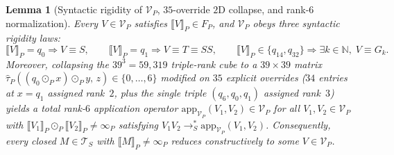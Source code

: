 \documentclass[11pt,reqno]{amsart}
\numberwithin{equation}{section}
\theoremstyle{plain}
\newtheorem{lemma}[theorem]{Lemma}
\theoremstyle{definition}
\theoremstyle{remark}
\newcommand{\TS}{\mathcal{T}_S}
\newcommand{\sem}[1]{\llbracket #1 \rrbracket}
\newcommand{\redSs}{\to_S^*}
\begin{document}
\begin{lemma}[Syntactic rigidity of $\mathcal{V}_P$, $35$-override $2$D collapse, and rank-$6$ normalization]\label{lem:pval-normalization}
Every $V \in \mathcal{V}_P$ satisfies $\sem{V}_P \in F_P$, and $\mathcal{V}_P$ obeys three syntactic rigidity laws:
\begin{equation}\label{eq:pval-rigidity}
\sem{V}_P = q_0 \Longrightarrow V \equiv S,
\qquad
\sem{V}_P = q_1 \Longrightarrow V \equiv T \equiv S S,
\qquad
\sem{V}_P \in \{q_{14}, q_{32}\} \Longrightarrow \exists k \in \mathbb{N},\; V \equiv G_k.
\end{equation}
Moreover, collapsing the $39^3 = 59{,}319$ triple-rank cube to a $39 \times 39$ matrix $\hat{\tau}_P((q_0 \odot_P x) \odot_P y,\, z) \in \{0, \dots, 6\}$ modified on $35$ explicit overrides ($34$ entries at $x = q_1$ assigned rank~$2$, plus the single triple $(q_6, q_0, q_1)$ assigned rank~$3$) yields a total rank-$6$ application operator $\mathrm{app}_{\mathcal{V}_P}(V_1, V_2) \in \mathcal{V}_P$ for all $V_1, V_2 \in \mathcal{V}_P$ with $\sem{V_1}_P \odot_P \sem{V_2}_P \neq \infty_P$ satisfying $V_1 V_2 \redSs \mathrm{app}_{\mathcal{V}_P}(V_1, V_2)$. Consequently, every closed $M \in \TS$ with $\sem{M}_P \neq \infty_P$ reduces constructively to some $V \in \mathcal{V}_P$.
\end{lemma}
\end{document}
